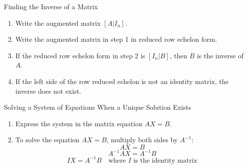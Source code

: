 \begin{summarybox}{Finding the Inverse of a Matrix}
    \begin{enumerate}
        \item Write the augmented matrix $[ A | I_n ]$.
        \item Write the augmented matrix in step 1 in reduced row echelon form.
        \item If the reduced row echelon form in step 2 is $[ I_n | B]$, then $B$ is the inverse of $A$.
        \item If the left side of the row reduced echelon is not an identity matrix, the inverse does not exist.
    \end{enumerate}
\end{summarybox}
\begin{summarybox}{Solving a System of Equations When a Unique Solution Exists}
    \begin{enumerate}
        \item Express the system in the matrix equation $AX = B$.
        \item To solve the equation $AX = B$, multiply both sides by $A^{-1}$:
              \[
                  AX = B
              \]
              \[
                  A^{-1}AX = A^{-1}B
              \]
              \[
                  I X = A^{-1}B \quad \text{where $I$ is the identity matrix}
              \]
    \end{enumerate}

\end{summarybox}